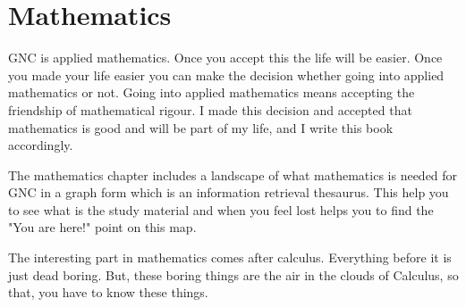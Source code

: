 \part{Mathematics}

GNC is applied mathematics. Once you accept this the life will be easier. Once
you made your life easier you can make the decision whether going into applied
mathematics or not. Going into applied mathematics means accepting the
friendship of mathematical rigour. I made this decision and accepted that
mathematics is good and will be part of my life, and I write this book
accordingly.

The mathematics chapter includes a landscape of what mathematics is needed for
GNC in a graph form which is an information retrieval thesaurus. This help you
to see what is the study material and when you feel lost helps you to find the
"You are here!" point on this map.

The interesting part in mathematics comes after calculus. Everything before it
is just dead boring. But, these boring things are the air in the clouds of
Calculus, so that, you have to know these things.






% 
% 
% 
